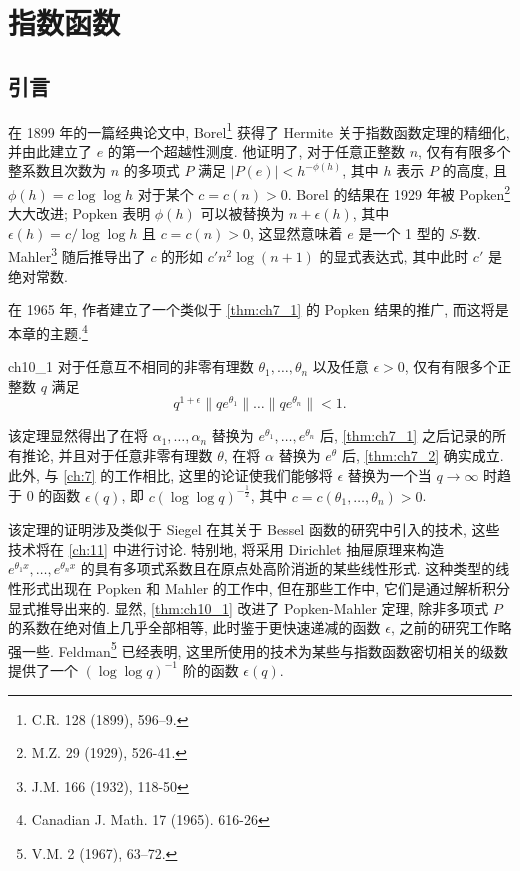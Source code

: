 
\chapter{指数函数}\label{ch:10}

\section{引言}\label{sec:ch10_1}

在 1899 年的一篇经典论文中, Borel\footnote{C.R. 128 (1899), 596--9.} 获得了 Hermite 关于指数函数定理的精细化, 并由此建立了 $e$ 的第一个超越性测度. 他证明了, 对于任意正整数 $n$, 仅有有限多个整系数且次数为 $n$ 的多项式 $P$ 满足 $|P(e)| < h^{-\phi(h)}$, 其中 $h$ 表示 $P$ 的高度, 且 $\phi(h) = c \log \log h$ 对于某个 $c = c(n) > 0$. Borel 的结果在 1929 年被 Popken\footnote{M.Z. 29 (1929), 526-41.} 大大改进; Popken 表明 $\phi(h)$ 可以被替换为 $n + \epsilon(h)$, 其中 $\epsilon(h) = c/\log \log h$ 且 $c = c(n) > 0$, 这显然意味着 $e$ 是一个 1 型的 $S$-数. Mahler\footnote{J.M. 166 (1932), 118-50} 随后推导出了 $c$ 的形如 $c'n^2\log(n+1)$ 的显式表达式, 其中此时 $c'$ 是绝对常数.

在 1965 年, 作者建立了一个类似于 \autoref{thm:ch7_1} 的 Popken 结果的推广, 而这将是本章的主题.\footnote{Canadian J. Math. 17 (1965). 616-26}

\begin{mythm}{}{ch10_1}
对于任意互不相同的非零有理数 $\theta_1, \ldots, \theta_n$ 以及任意 $\epsilon > 0$, 仅有有限多个正整数 $q$ 满足
\[q^{1+\epsilon} \|q e^{\theta_1}\| \dots \|q e^{\theta_n}\| < 1.\]
\end{mythm}

该定理显然得出了在将 $\alpha_1, \ldots, \alpha_n$ 替换为 $e^{\theta_1}, \ldots, e^{\theta_n}$ 后, \autoref{thm:ch7_1} 之后记录的所有推论, 并且对于任意非零有理数 $\theta$, 在将 $\alpha$ 替换为 $e^{\theta}$ 后, \autoref{thm:ch7_2} 确实成立. 此外, 与 \autoref{ch:7} 的工作相比, 这里的论证使我们能够将 $\epsilon$ 替换为一个当 $q \to \infty$ 时趋于 0 的函数 $\epsilon(q)$, 即 $c(\log \log q)^{-\frac{1}{2}}$, 其中 $c = c(\theta_1, \ldots, \theta_n) > 0$.

该定理的证明涉及类似于 Siegel 在其关于 Bessel 函数的研究中引入的技术, 这些技术将在 \autoref{ch:11} 中进行讨论. 特别地, 将采用 Dirichlet 抽屉原理来构造 $e^{\theta_1 x}, \ldots, e^{\theta_n x}$ 的具有多项式系数且在原点处高阶消逝的某些线性形式. 这种类型的线性形式出现在 Popken 和 Mahler 的工作中, 但在那些工作中, 它们是通过解析积分显式推导出来的. 显然, \autoref{thm:ch10_1} 改进了 Popken-Mahler 定理, 除非多项式 $P$ 的系数在绝对值上几乎全部相等, 此时鉴于更快速递减的函数 $\epsilon$, 之前的研究工作略强一些. Feldman\footnote{V.M. 2 (1967), 63--72.} 已经表明, 这里所使用的技术为某些与指数函数密切相关的级数提供了一个 $(\log \log q)^{-1}$ 阶的函数 $\epsilon(q)$.

